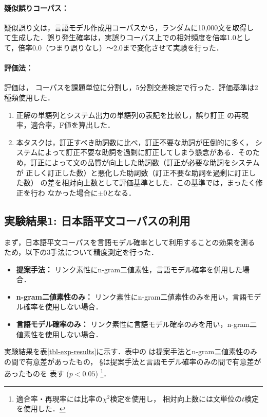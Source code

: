 \documentclass[japanese]{jnlp_1.4}
\begin{document}
\paragraph{疑似誤りコーパス：}

疑似誤り文は，言語モデル作成用コーパスから，ランダムに10,000文を取得し
て生成した．誤り発生確率は，実誤りコーパス上での相対頻度を倍率1.0とし
て，倍率0.0（つまり誤りなし）〜2.0まで変化させて実験を行った．

\paragraph{評価法：}
評価は，
コーパスを課題単位に分割し，5分割交差検定で行った．評価基準は2
種類使用した．

\begin{enumerate}
\item 正解の単語列とシステム出力の単語列の表記を比較し，誤り訂正
の再現率，適合率，F値を算出した．

\item 本タスクは，訂正すべき助詞数に比べ，訂正不要な助詞が圧倒的に多く，
システムによって訂正不要な助詞を過剰に訂正してしまう懸念がある．そのた
め，訂正によって文の品質が向上した助詞数（訂正が必要な助詞をシステムが
正しく訂正した数）と悪化した助詞数（訂正不要な助詞を過剰に訂正した数）
の差を相対向上数として評価基準とした．この基準では，まったく修正を行わ
なかった場合に$\pm 0$となる．
\end{enumerate}



\subsection{実験結果1: 日本語平文コーパスの利用}

まず，日本語平文コーパスを言語モデル確率として利用することの効果を測る
ため，以下の3手法について精度測定を行った．

\begin{itemize}
\item \textbf{提案手法：}
リンク素性にn-gram二値素性，言語モデル確率を併用した場合．
\item \textbf{n-gram二値素性のみ：}
リンク素性にn-gram二値素性のみを用い，言語モデル確率を使用しない場合．
\item \textbf{言語モデル確率のみ：}
リンク素性に言語モデル確率のみを用い，n-gram二値素性を使用しない場合．
\end{itemize}

実験結果を表\ref{tbl-exp-results}に示す．表中の
\mbox{\dag}は提案手法とn-gram二値素性のみの間で有意差があったもの，
\mbox{\S}は提案手法と言語モデル確率のみの間で有意差があったものを
表す ({$p < 0.05$}) 
\footnote{適合率・再現率には比率の$\chi^2$検定を使用し，
相対向上数には文単位の$t$検定を使用した．}．
\end{document}
